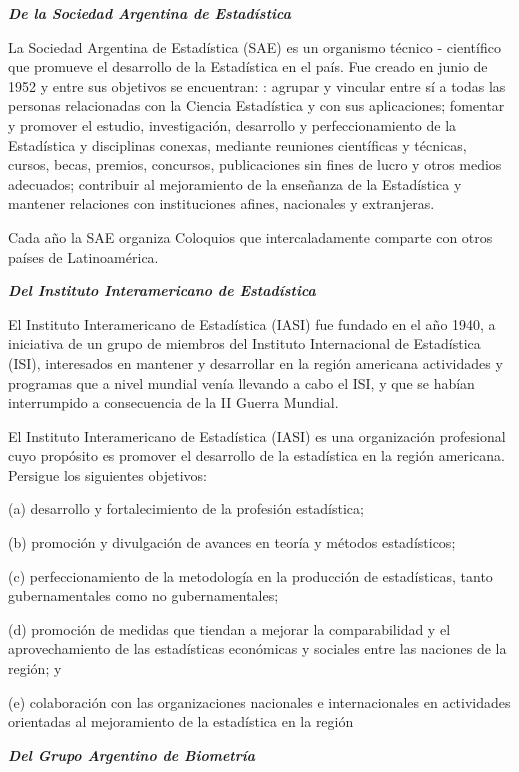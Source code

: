 \bigbreak
\noindent\textbf{\textit{De la Sociedad Argentina de Estadística}}

La Sociedad Argentina de Estadística (SAE) es un organismo técnico - científico que promueve el desarrollo de la Estadística en el país. Fue creado en junio de 1952 y entre sus objetivos se encuentran: : agrupar y vincular entre sí a todas las personas relacionadas con la Ciencia Estadística y con sus aplicaciones; fomentar y promover el estudio, investigación, desarrollo y perfeccionamiento de la Estadística y disciplinas conexas, mediante reuniones científicas y técnicas, cursos, becas, premios, concursos, publicaciones sin fines de lucro y otros medios adecuados; contribuir al mejoramiento de la enseñanza de la Estadística y mantener relaciones con instituciones afines, nacionales y extranjeras.

Cada año la SAE organiza Coloquios que intercaladamente comparte con otros países de Latinoamérica.

\bigbreak
\noindent\textbf{\textit{Del Instituto Interamericano de Estadística}}

El Instituto Interamericano de Estadística (IASI) fue fundado en el año 1940, a iniciativa de un grupo de miembros del Instituto Internacional de Estadística (ISI), interesados en mantener y desarrollar en la región americana actividades y programas que a nivel mundial venía llevando a cabo el ISI, y que se habían interrumpido a consecuencia de la II Guerra Mundial.

El Instituto Interamericano de Estadística (IASI) es una organización profesional cuyo propósito es promover el desarrollo de la estadística en la región americana.  Persigue los siguientes objetivos: 

(a) desarrollo y fortalecimiento de la profesión estadística;

(b) promoción y divulgación de avances en teoría y métodos estadísticos;

(c) perfeccionamiento de la metodología en la producción de estadísticas, tanto gubernamentales como no gubernamentales;

(d) promoción de medidas que tiendan a mejorar la comparabilidad y el aprovechamiento de las estadísticas económicas y sociales entre las naciones de la región; y

(e) colaboración con las organizaciones nacionales e internacionales en actividades orientadas al mejoramiento de la estadística en la región

\bigbreak
\noindent\textbf{\textit{Del Grupo Argentino de Biometría}}

